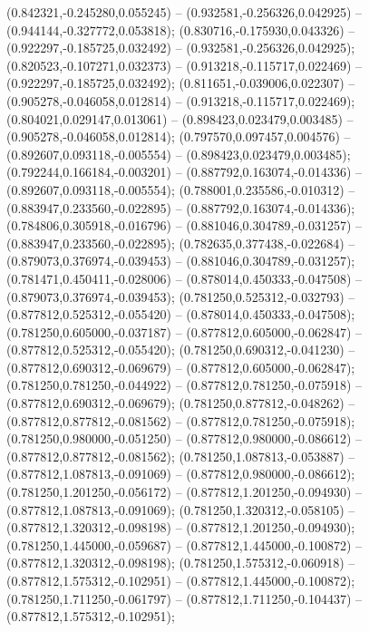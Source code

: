  (0.842321,-0.245280,0.055245) -- (0.932581,-0.256326,0.042925) -- (0.944144,-0.327772,0.053818);
 (0.830716,-0.175930,0.043326) -- (0.922297,-0.185725,0.032492) -- (0.932581,-0.256326,0.042925);
 (0.820523,-0.107271,0.032373) -- (0.913218,-0.115717,0.022469) -- (0.922297,-0.185725,0.032492);
 (0.811651,-0.039006,0.022307) -- (0.905278,-0.046058,0.012814) -- (0.913218,-0.115717,0.022469);
 (0.804021,0.029147,0.013061) -- (0.898423,0.023479,0.003485) -- (0.905278,-0.046058,0.012814);
 (0.797570,0.097457,0.004576) -- (0.892607,0.093118,-0.005554) -- (0.898423,0.023479,0.003485);
 (0.792244,0.166184,-0.003201) -- (0.887792,0.163074,-0.014336) -- (0.892607,0.093118,-0.005554);
 (0.788001,0.235586,-0.010312) -- (0.883947,0.233560,-0.022895) -- (0.887792,0.163074,-0.014336);
 (0.784806,0.305918,-0.016796) -- (0.881046,0.304789,-0.031257) -- (0.883947,0.233560,-0.022895);
 (0.782635,0.377438,-0.022684) -- (0.879073,0.376974,-0.039453) -- (0.881046,0.304789,-0.031257);
 (0.781471,0.450411,-0.028006) -- (0.878014,0.450333,-0.047508) -- (0.879073,0.376974,-0.039453);
 (0.781250,0.525312,-0.032793) -- (0.877812,0.525312,-0.055420) -- (0.878014,0.450333,-0.047508);
 (0.781250,0.605000,-0.037187) -- (0.877812,0.605000,-0.062847) -- (0.877812,0.525312,-0.055420);
 (0.781250,0.690312,-0.041230) -- (0.877812,0.690312,-0.069679) -- (0.877812,0.605000,-0.062847);
 (0.781250,0.781250,-0.044922) -- (0.877812,0.781250,-0.075918) -- (0.877812,0.690312,-0.069679);
 (0.781250,0.877812,-0.048262) -- (0.877812,0.877812,-0.081562) -- (0.877812,0.781250,-0.075918);
 (0.781250,0.980000,-0.051250) -- (0.877812,0.980000,-0.086612) -- (0.877812,0.877812,-0.081562);
 (0.781250,1.087813,-0.053887) -- (0.877812,1.087813,-0.091069) -- (0.877812,0.980000,-0.086612);
 (0.781250,1.201250,-0.056172) -- (0.877812,1.201250,-0.094930) -- (0.877812,1.087813,-0.091069);
 (0.781250,1.320312,-0.058105) -- (0.877812,1.320312,-0.098198) -- (0.877812,1.201250,-0.094930);
 (0.781250,1.445000,-0.059687) -- (0.877812,1.445000,-0.100872) -- (0.877812,1.320312,-0.098198);
 (0.781250,1.575312,-0.060918) -- (0.877812,1.575312,-0.102951) -- (0.877812,1.445000,-0.100872);
 (0.781250,1.711250,-0.061797) -- (0.877812,1.711250,-0.104437) -- (0.877812,1.575312,-0.102951);
